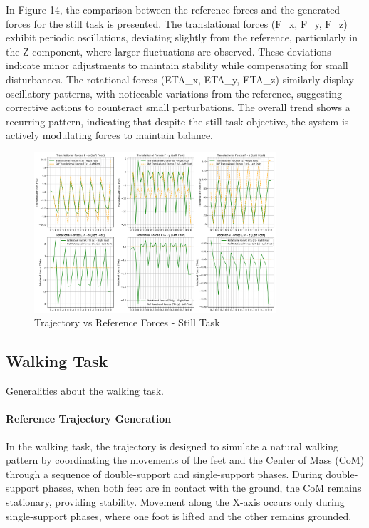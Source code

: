 \documentclass[main.tex]{subfiles}
\begin{document}
In Figure 14, the comparison between the reference forces and the generated forces for the still task is presented. The translational forces (F\_x, F\_y, F\_z) exhibit periodic oscillations, deviating slightly from the reference, particularly in the Z component, where larger fluctuations are observed. These deviations indicate minor adjustments to maintain stability while compensating for small disturbances.
The rotational forces (ETA\_x, ETA\_y, ETA\_z) similarly display oscillatory patterns, with noticeable variations from the reference, suggesting corrective actions to counteract small perturbations. The overall trend shows a recurring pattern, indicating that despite the still task objective, the system is actively modulating forces to maintain balance.
\begin{figure}[htbp]
    \centering
    \includegraphics[width=0.8\textwidth]{figures/contact_forces_walking.png}
    \caption{Trajectory vs Reference Forces - Still Task}
    \label{fig:contact_forces_walking}
\end{figure}

\subsection{Walking Task}
Generalities about the walking task. 
\paragraph{Reference Trajectory Generation}
In the walking task, the trajectory is designed to simulate a natural walking pattern by coordinating the movements of the feet and the Center of Mass (CoM) through a sequence of double-support and single-support phases. During double-support phases, when both feet are in contact with the ground, the CoM remains stationary, providing stability. Movement along the X-axis occurs only during single-support phases, where one foot is lifted and the other remains grounded.
\end{document}
